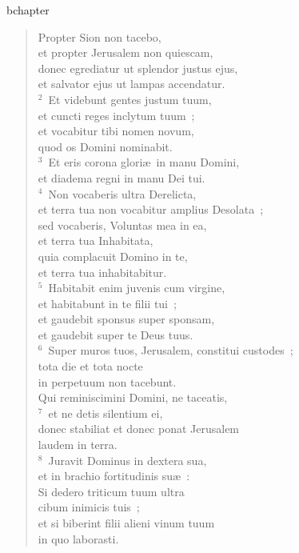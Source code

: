 bchapter\begin{verse}\vspace{-19pt}Propter Sion non tacebo,\\ et propter Jerusalem non quiescam,\\ donec egrediatur ut splendor justus ejus,\\ et salvator ejus ut lampas accendatur.\\
${}^{2}$~Et videbunt gentes justum tuum,\\ et cuncti reges inclytum tuum~;\\ et vocabitur tibi nomen novum,\\ quod os Domini nominabit.\\
${}^{3}$~Et eris corona glori\ae\ in manu Domini,\\ et diadema regni in manu Dei tui.\\
${}^{4}$~Non vocaberis ultra Derelicta,\\ et terra tua non vocabitur amplius Desolata~;\\ sed vocaberis, Voluntas mea in ea,\\ et terra tua Inhabitata,\\ quia complacuit Domino in te,\\ et terra tua inhabitabitur.\\
${}^{5}$~Habitabit enim juvenis cum virgine,\\ et habitabunt in te filii tui~;\\ et gaudebit sponsus super sponsam,\\ et gaudebit super te Deus tuus.\\
${}^{6}$~Super muros tuos, Jerusalem, constitui custodes~;\\ tota die et tota nocte\\ in perpetuum non tacebunt.\\ Qui reminiscimini Domini, ne taceatis,\\
${}^{7}$~et ne detis silentium ei,\\ donec stabiliat et donec ponat Jerusalem\\ laudem in terra.\\
${}^{8}$~Juravit Dominus in dextera sua,\\ et in brachio fortitudinis su\ae~:\\ Si dedero triticum tuum ultra\\ cibum inimicis tuis~;\\ et si biberint filii alieni vinum tuum\\ in quo laborasti.\\

\end{verse}
